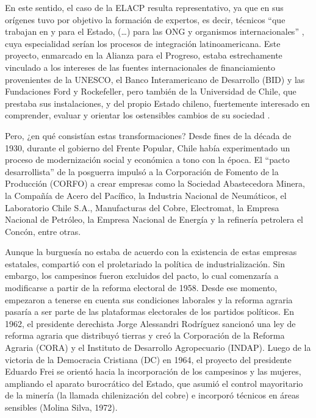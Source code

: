 En este sentido, el caso de la ELACP resulta representativo, ya que en sus orígenes tuvo por objetivo la formación de expertos, es decir, técnicos \enquote{que trabajan en y para el Estado, (\dots) para las ONG y organismos internacionales} \parencite[15]{1549-NEIBURG2004}, cuya especialidad serían los procesos de integración latinoamericana. Este proyecto, enmarcado en la Alianza para el Progreso, estaba estrechamente vinculado a los intereses de las fuentes internacionales de financiamiento provenientes de la UNESCO, el Banco Interamericano de Desarrollo (BID) y las Fundaciones Ford y Rockefeller, pero también de la Universidad de Chile, que prestaba sus instalaciones, y del propio Estado chileno, fuertemente interesado en comprender, evaluar y orientar los ostensibles cambios de su sociedad \parencite{1514-ABARZUACUTRONI2010,1524-BEIGEL2010,1529-QUESADA2010}.

Pero, ¿en qué consistían estas transformaciones? Desde fines de la década de 1930, durante el gobierno del Frente Popular, Chile había experimentado un proceso de modernización social y económica a tono con la época. El \enquote{pacto desarrollista} de la posguerra impulsó a la Corporación de Fomento de la Producción (CORFO) a crear empresas como la Sociedad Abastecedora Minera, la Compañía de Acero del Pacífico, la Industria Nacional de Neumáticos, el Laboratorio Chile S.A., Manufacturas del Cobre, Electromat, la Empresa Nacional de Petróleo, la Empresa Nacional de Energía y la refinería petrolera el Concón, entre otras.

Aunque la burguesía no estaba de acuerdo con la existencia de estas empresas estatales, compartió con el proletariado la política de industrialización. Sin embargo, los campesinos fueron excluidos del pacto, lo cual comenzaría a modificarse a partir de la reforma electoral de 1958. Desde ese momento, empezaron a tenerse en cuenta sus condiciones laborales y la reforma agraria pasaría a ser parte de las plataformas electorales de los partidos políticos. En 1962, el presidente derechista Jorge Alessandri Rodríguez sancionó una ley de reforma agraria que distribuyó tierras y creó la Corporación de la Reforma Agraria (CORA) y el Instituto de Desarrollo Agropecuario (INDAP). Luego de la victoria de la Democracia Cristiana (DC) en 1964, el proyecto del presidente Eduardo Frei se orientó hacia la incorporación de los campesinos y las mujeres, ampliando el aparato burocrático del Estado, que asumió el control mayoritario de la minería (la llamada chilenización del cobre) e incorporó técnicos en áreas sensibles \parencite{1517-ALWIN1986,1614-DERIZ1979}(Molina Silva, 1972).

